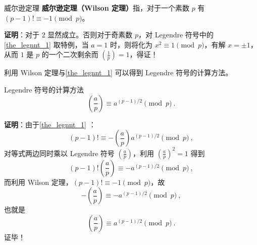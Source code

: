 
\begin{theorem}{威尔逊定理}
\textbf{威尔逊定理（Wilson 定理）}指，对于一个素数 $p$ 有 $(p-1)! \equiv -1 \pmod p$。
\end{theorem}
\textbf{证明}：对于 $2$ 显然成立。否则对于奇素数 $p$，对 Legendre 符号中的\autoref{the_legnnt_1} 取特例，当 $a=1$ 时，则将化为 $x^2 \equiv 1 \pmod p$，有解 $x = \pm 1$，从而 $1$ 是 $p$ 的一个二次剩余而 $\left(\frac 1p\right)=1$，得证！

利用 Wilson 定理与\autoref{the_legnnt_1} 可以得到 Legendre 符号的计算方法。
\begin{theorem}{Legendre 符号的计算方法}\label{the_wilsth_1}
\begin{equation}
\left(\frac ap\right) \equiv a^{(p-1)/2} \pmod p ~.
\end{equation}
\end{theorem}
\textbf{证明}：由于\autoref{the_legnnt_1} ：
\begin{equation}
(p-1)! \equiv -\left(\frac ap\right) a^{(p-1)/2} \pmod p ~,
\end{equation}
对等式两边同时乘以 Legendre 符号 $\left(\frac ap\right)$，利用 $\left(\frac ap\right)^2 = 1$ 得到
\begin{equation}
(p-1)!\left(\frac ap\right) \equiv - a^{(p-1)/2} \pmod p ~,
\end{equation}
而利用 Wilson 定理，$(p-1)! \equiv -1 \pmod p$，故
\begin{equation}
-\left(\frac ap\right) \equiv - a^{(p-1)/2} \pmod p ~,
\end{equation}
也就是
\begin{equation}
\left(\frac ap\right) \equiv a^{(p-1)/2} \pmod p ~.
\end{equation}
证毕！